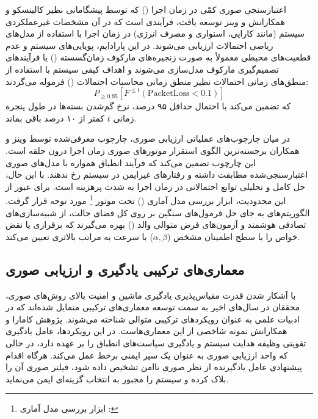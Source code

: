 \documentclass[oneside,openany,phd]{TMU-Thesis}
\begin{document}
اعتبارسنجی صوری کمّی در زمان اجرا () که توسط پیشگامانی نظیر کالینسکو و همکارانش \cite{calinescu2011formal} و وینز \cite{weyns2012formal} توسعه یافت، فرآیندی است که در آن مشخصات غیرعملکردی سیستم (مانند کارایی، استواری و مصرف انرژی) در زمان اجرا با استفاده از مدل‌های ریاضی احتمالات ارزیابی می‌شوند. در این پارادایم، پویایی‌های سیستم و عدم قطعیت‌های محیطی معمولاً به صورت زنجیره‌های مارکوف زمان‌گسسته () یا فرآیندهای تصمیم‌گیری مارکوف مدل‌سازی می‌شوند و اهداف کیفی سیستم با استفاده از منطق‌های زمانی احتمالات نظیر منطق زمانی محاسبات احتمالات () فرموله می‌گردند:
\begin{equation}
    P_{\geq 0.95} [ F^{\leq t} (\text{PacketLoss} < 0.1) ]
\end{equation}
که تضمین می‌کند با احتمال حداقل ۹۵ درصد، نرخ گم‌شدن بسته‌ها در طول پنجره زمانی $t$ کمتر از ۱۰ درصد باقی بماند.

در میان چارچوب‌های عملیاتی ارزیابی صوری، چارچوب  معرفی‌شده توسط وینز و همکاران \cite{weyns2018activforms} برجسته‌ترین الگوی استقرار موتورهای صوری زمان اجرا درون حلقه  است. این چارچوب تضمین می‌کند که فرآیند انطباق همواره با مدل‌های صوری اعتبارسنجی‌شده مطابقت داشته و رفتارهای غیرایمن در سیستم رخ ندهند. با این حال، حل کامل و تحلیلی توابع احتمالاتی در زمان اجرا به شدت پرهزینه است. برای عبور از این محدودیت، ابزار بررسی مدل آماری () تحت موتور \footnote{ابزار بررسی مدل آماری : } \cite{david2015uppaal} مورد توجه قرار گرفت. الگوریتم‌های  به جای حل فرمول‌های سنگین بر روی کل فضای حالت، از شبیه‌سازی‌های تصادفی هوشمند و آزمون‌های فرض متوالی والد () بهره می‌گیرند که برقراری یا نقض خواص را با سطح اطمینان مشخص ($\alpha, \beta$) با سرعت به مراتب بالاتری تعیین می‌کند.

\subsection{معماری‌های ترکیبی یادگیری و ارزیابی صوری}
\label{sec:ch3_hybrid_verification_learning}

با آشکار شدن قدرت مقیاس‌پذیری یادگیری ماشین و امنیت بالای روش‌های صوری، محققان در سال‌های اخیر به سمت توسعه معماری‌های ترکیبی متمایل شده‌اند که در ادبیات علمی به عنوان رویکردهای ترکیبی متوالی شناخته می‌شوند. پژوهش کامارا و همکارانش \cite{camara2020quantitative} نمونه شاخصی از این معماری‌هاست. در این رویکردها، عامل یادگیری تقویتی وظیفه هدایت سیستم و یادگیری سیاست‌های انطباق را بر عهده دارد، در حالی که واحد ارزیابی صوری به عنوان یک سپر ایمنی برخط عمل می‌کند. هرگاه اقدام پیشنهادی عامل یادگیرنده از نظر صوری ناامن تشخیص داده شود، فیلتر صوری آن را بلاک کرده و سیستم را مجبور به انتخاب گزینه‌ای ایمن می‌نماید.
\end{document}
